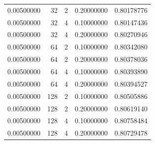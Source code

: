 \begin{table}[htbp]
{\begin{tabular}{rrrrr}
0.00500000 & 32 & 2 & 0.20000000 & 0.80178776 \\
0.00500000 & 32 & 4 & 0.10000000 & 0.80147436 \\
0.00500000 & 32 & 4 & 0.20000000 & 0.80270946 \\
0.00500000 & 64 & 2 & 0.10000000 & 0.80342080 \\
0.00500000 & 64 & 2 & 0.20000000 & 0.80378036 \\
0.00500000 & 64 & 4 & 0.10000000 & 0.80393890 \\
0.00500000 & 64 & 4 & 0.20000000 & 0.80394527 \\
0.00500000 & 128 & 2 & 0.10000000 & 0.80505886 \\
0.00500000 & 128 & 2 & 0.20000000 & 0.80619140 \\
0.00500000 & 128 & 4 & 0.10000000 & 0.80758484 \\
0.00500000 & 128 & 4 & 0.20000000 & 0.80729478 \\
\hline
\end{tabular}
}
\end{table}
